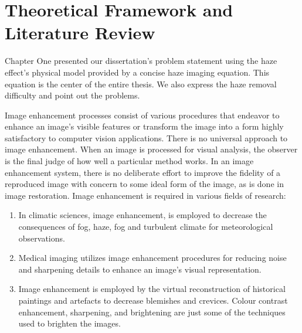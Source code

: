\documentclass[doctor,english,listoffigures,listoftables]{thesis-uestc}
\begin{document}
\chapter{Theoretical Framework and Literature Review}
Chapter One presented our dissertation's problem statement using the haze effect's physical model provided by a concise haze imaging equation. This equation is the center of the entire thesis. We also express the haze removal difficulty and point out the problems.\par
Image enhancement processes consist of various procedures that endeavor to enhance an image's visible features or transform the image into a form highly satisfactory to computer vision applications. There is no universal approach to image enhancement. When an image is processed for visual analysis, the observer is the final judge of how well a particular method works. In an image enhancement system, there is no deliberate effort to improve the fidelity of a reproduced image with concern to some ideal form of the image, as is done in image restoration. Image enhancement is required in various fields of research:
\begin{enumerate}
\item In climatic sciences, image enhancement, is employed to decrease the consequences of fog, haze, fog and turbulent climate for meteorological observations. 
\item Medical imaging utilizes image enhancement procedures for reducing noise and sharpening details to enhance an image's visual representation. 
\item Image enhancement is employed by the virtual reconstruction of historical paintings and artefacts to decrease blemishes and crevices. Colour contrast enhancement, sharpening, and brightening are just some of the techniques used to brighten the images. 
\end{enumerate}
\end{document}
